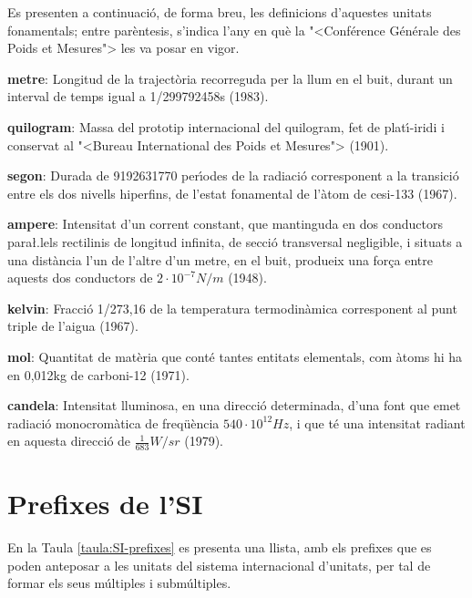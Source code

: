 Es presenten a continuaci\'{o}, de forma breu, les definicions
d'aquestes unitats fonamentals; entre par\`{e}ntesis, s'indica l'any en
qu\`{e} la {"<}Conf\'{e}rence G\'{e}n\'{e}rale des Poids et Mesures{">} les va posar en
vigor.

\begin{list}{}
   {\setlength{\labelwidth}{22mm} \setlength{\leftmargin}{22mm} \setlength{\labelsep}{2mm}}
   \item[\textbf{metre}:] Longitud de la traject\`{o}ria recorreguda per la llum
   en el buit, durant un interval de temps igual a 1/299792458\unit{s} (1983).
   \item[\textbf{quilogram}:] Massa del prototip internacional del quilogram, fet de plat\'{\i}-iridi i
    conservat al {"<}Bureau International des Poids et Mesures{">} (1901).
   \item[\textbf{segon}:] Durada de 9192631770 per\'{\i}odes de la
   radiaci\'{o} corresponent a la transici\'{o} entre els dos nivells
  hiperfins, de l'estat fonamental de l'\`{a}tom de cesi-133 (1967).
   \item[\textbf{ampere}:] Intensitat d'un corrent constant,
   que mantinguda en dos conductors para{\l.l}els rectilinis de longitud
   infinita, de secci\'{o} transversal negligible, i situats a una
   dist\`{a}ncia l'un de l'altre d'un metre, en el buit, produeix una for\c{c}a entre
   aquests dos conductors de $2\cdot10^{-7}\unit{N/m}$ (1948).
   \item[\textbf{kelvin}:] Fracci\'{o} 1/273,16 de la temperatura
   termodin\`{a}mica corresponent al punt triple de l'aigua (1967).
   \item[\textbf{mol}:] Quantitat de mat\`{e}ria que cont\'{e} tantes
   entitats elementals, com \`{a}toms hi ha en 0,012\unit{kg} de carboni-12 (1971).
   \item[\textbf{candela}:] Intensitat lluminosa, en una direcci\'{o} determinada,
   d'una font que emet radiaci\'{o} monocrom\`{a}tica de freq\"{u}\`{e}ncia $540\cdot10^{12}\unit{Hz}$, i
   que t\'{e} una intensitat radiant en aquesta direcci\'{o} de $\frac{1}{683}\unit{W/sr}$ (1979).
\end{list}


\section{Prefixes de l'SI}

En la Taula \vref{taula:SI-prefixes} es presenta una llista, amb els
prefixes que es poden anteposar a les unitats del sistema
internacional d'unitats, per tal de formar els seus m\'{u}ltiples i
subm\'{u}ltiples.

